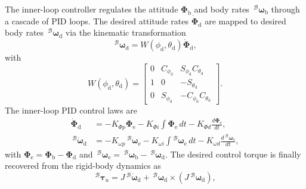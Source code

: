 \documentclass[10pt,journal]{IEEEtran}
\begin{document}
The inner-loop controller regulates the attitude $\boldsymbol{\Phi}_\text{b}$ and body rates $\,^\mathcal{B}\boldsymbol{\omega}_\text{b}$ through a cascade of PID loops. The desired attitude rates $\dot{\boldsymbol{\Phi}}_\text{d}$ are mapped to desired body rates $\,^\mathcal{B}\boldsymbol{\omega}_\text{d}$ via the kinematic transformation
\begin{equation} \label{sup:kinematic_transformation}
    \,^\mathcal{B}\boldsymbol{\omega}_\text{d} = W(\phi_\text{d},\theta_\text{d})\dot{\boldsymbol{\Phi}}_\text{d},
\end{equation}
with
\begin{equation*}
    W(\phi_\text{d},\theta_\text{d}) = \begin{bmatrix} 0 & C_{\phi_\text{d}} & S_{\phi_\text{d}}C_{\theta_\text{d}} \\ 1 & 0 & -S_{\theta_\text{d}} \\ 0 & S_{\phi_\text{d}} & -C_{\phi_\text{d}}C_{\theta_\text{d}} \end{bmatrix}.
\end{equation*}
The inner-loop PID control laws are
\begin{align}
    \dot{\boldsymbol{\Phi}}_\text{d} &= - K_{\Phi p}\boldsymbol{\Phi}_\text{e} - K_{\Phi i}\!\int\!\boldsymbol{\Phi}_\text{e}\,dt - K_{\Phi d}\frac{d\boldsymbol{\Phi}_\text{e}}{dt}, \nonumber \\
    \,^\mathcal{B}\dot{\boldsymbol{\omega}}_\text{d} &= - K_{\omega p}\,^\mathcal{B}\boldsymbol{\omega}_\text{e} - K_{\omega i}\!\int\!^\mathcal{B}\boldsymbol{\omega}_\text{e}\,dt - K_{\omega d}\frac{d\,^\mathcal{B}\boldsymbol{\omega}_\text{e}}{dt},
\end{align}
with $\boldsymbol{\Phi}_\text{e}=\boldsymbol{\Phi}_\text{b}-\boldsymbol{\Phi}_\text{d}$ and $\,^\mathcal{B}\boldsymbol{\omega}_\text{e}=\,^\mathcal{B}\boldsymbol{\omega}_\text{b}-\,^\mathcal{B}\boldsymbol{\omega}_\text{d}$. The desired control torque is finally recovered from the rigid-body dynamics as
\begin{equation} \label{sup:tau_des}
    \,^\mathcal{B}\boldsymbol{\tau}_u = J\,^\mathcal{B}\dot{\boldsymbol{\omega}}_\text{d} + \,^\mathcal{B}\boldsymbol{\omega}_\text{d}\times(J\,^\mathcal{B}\boldsymbol{\omega}_\text{d}),
\end{equation}
\end{document}
